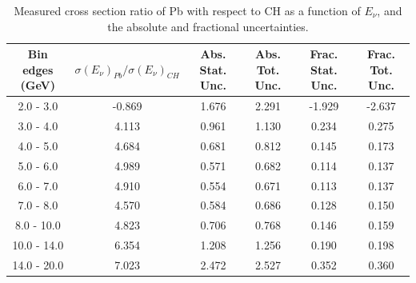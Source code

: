 \documentclass[aps,prl,twocolumn,superscriptaddress,nofootinbib]{revtex4-1}
\begin{document}
\begin{table}[h!]
  \centering
  \caption{Measured cross section ratio of Pb with respect to CH as a function
  of $E_{\nu}$,  and the absolute and fractional uncertainties.}
    \begin{tabular}{c||c||c|c||c|c}
      Bin edges (GeV) & $\sigma(E_{\nu})_{Pb}/\sigma(E_{\nu})_{CH}$ & Abs. Stat. Unc. & Abs. Tot. Unc. & Frac. Stat. Unc. & Frac. Tot. Unc. \\
      \hline\hline
        2.0 - 3.0 & -0.869 & 1.676 & 2.291 & -1.929 & -2.637 \\
        3.0 - 4.0 & 4.113 & 0.961 & 1.130 & 0.234 & 0.275 \\
        4.0 - 5.0 & 4.684 & 0.681 & 0.812 & 0.145 & 0.173 \\
        5.0 - 6.0 & 4.989 & 0.571 & 0.682 & 0.114 & 0.137 \\
        6.0 - 7.0 & 4.910 & 0.554 & 0.671 & 0.113 & 0.137 \\
        7.0 - 8.0 & 4.570 & 0.584 & 0.686 & 0.128 & 0.150 \\
       8.0 - 10.0 & 4.823 & 0.706 & 0.768 & 0.146 & 0.159 \\
      10.0 - 14.0 & 6.354 & 1.208 & 1.256 & 0.190 & 0.198 \\
      14.0 - 20.0 & 7.023 & 2.472 & 2.527 & 0.352 & 0.360 \\
    \end{tabular}
  \label{table:EnuXSecRatio_Pb}
\end{table}
\end{document}
